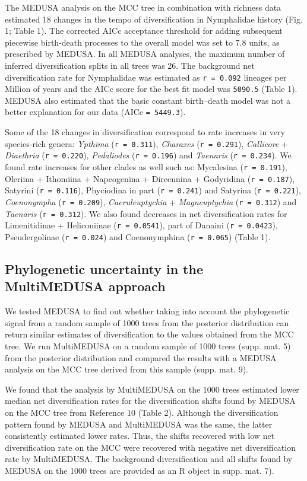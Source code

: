 \documentclass[10pt]{article}
\begin{document}
The MEDUSA analysis on the MCC tree in combination with richness data
estimated 18 changes in the tempo of diversification in Nymphalidae
history (Fig. 1; Table 1). The corrected AICc acceptance threshold for
adding subsequent piecewise birth-death processes to the overall model
was set to 7.8 units, as prescribed by MEDUSA. In all MEDUSA analyses,
the maximum number of inferred diversification splits in all trees was
26. The background net diversification rate for Nymphalidae was
estimated as \texttt{r = 0.092} lineages per Million of years and the
AICc score for the best fit model was \texttt{5090.5} (Table 1). MEDUSA
also estimated that the basic constant birth--death model was not a
better explanation for our data (AICc \texttt{= 5449.3}).

Some of the 18 changes in diversification correspond to rate increases
in very species-rich genera: \emph{Ypthima} (\texttt{r = 0.311}),
\emph{Charaxes} (\texttt{r = 0.291}), \emph{Callicore} +
\emph{Diaethria} (\texttt{r = 0.220}), \emph{Pedaliodes}
(\texttt{r = 0.196}) and \emph{Taenaris} (\texttt{r = 0.234}). We found
rate increases for other clades as well such as: Mycalesina
(\texttt{r = 0.191}), Oleriina + Ithomiina + Napeogenina + Dircennina +
Godyridina (\texttt{r = 0.187}), Satyrini (\texttt{r = 0.116}),
Phyciodina in part (\texttt{r = 0.241}) and Satyrina
(\texttt{r = 0.221}), \emph{Coenonympha} (\texttt{r = 0.209}),
\emph{Caeruleuptychia} + \emph{Magneuptychia} (\texttt{r = 0.312}) and
\emph{Taenaris} (\texttt{r = 0.312}). We also found decreases in net
diversification rates for Limenitidinae + Heliconiinae
(\texttt{r = 0.0541}), part of Danaini (\texttt{r = 0.0423}),
Pseudergolinae (\texttt{r = 0.024}) and Coenonymphina
(\texttt{r = 0.065}) (Table 1).

\subsection*{Phylogenetic uncertainty in the MultiMEDUSA
approach}

We tested MEDUSA to find out whether taking into account the
phylogenetic signal from a random sample of 1000 trees from the
posterior distribution can return similar estimates of diversification
to the values obtained from the MCC tree. We run MultiMEDUSA on a random
sample of 1000 trees (supp. mat. 5) from the posterior distribution and
compared the results with a MEDUSA analysis on the MCC tree derived from
this sample (supp. mat. 9).

We found that the analysis by MultiMEDUSA on the 1000 trees estimated
lower median net diversification rates for the diversification shifts
found by MEDUSA on the MCC tree from Reference 10 (Table 2). Although
the diversification pattern found by MEDUSA and MultiMEDUSA was the
same, the latter consistently estimated lower rates. Thus, the shifts
recovered with low net diversification rate on the MCC were recovered
with negative net diversification rate by MultiMEDUSA. The background
diversification and all shifts found by MEDUSA on the 1000 trees are
provided as an R object in supp. mat. 7).
\end{document}
